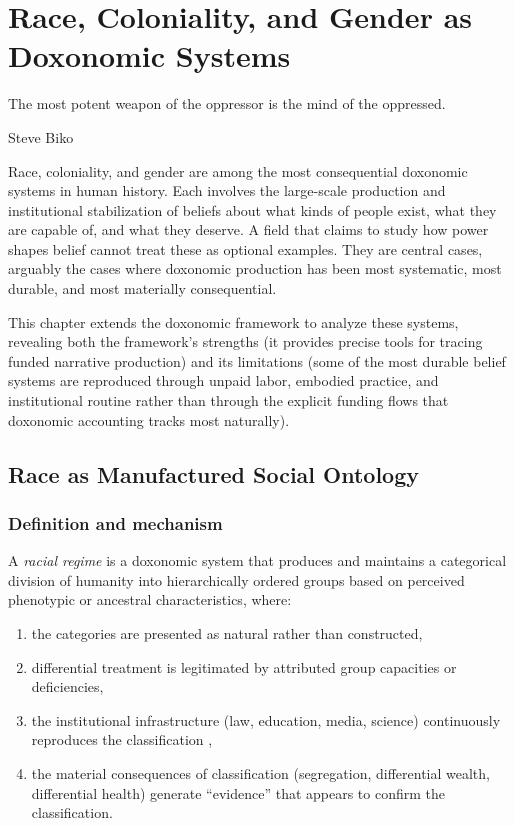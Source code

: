 \chapter{Race, Coloniality, and Gender as Doxonomic Systems}
\label{ch:race-coloniality-gender}

\epigraph{The most potent weapon of the oppressor is the mind of the oppressed.}{Steve Biko}

\noindent
Race, coloniality, and gender are among the most consequential doxonomic systems in human history.
Each involves the large-scale production and institutional stabilization of beliefs about what kinds of people exist, what they are capable of, and what they deserve.
A field that claims to study how power shapes belief cannot treat these as optional examples.
They are central cases, arguably the cases where doxonomic production has been most systematic, most durable, and most materially consequential.

This chapter extends the doxonomic framework to analyze these systems, revealing both the framework's strengths (it provides precise tools for tracing funded narrative production) and its limitations (some of the most durable belief systems are reproduced through unpaid labor, embodied practice, and institutional routine rather than through the explicit funding flows that doxonomic accounting tracks most naturally).

\section{Race as Manufactured Social Ontology}
\label{sec:ch24b-race}

\subsection{Definition and mechanism}

\begin{definition}
\label{def:racial-regime}
A \emph{racial regime} is a doxonomic system that produces and maintains a categorical division of humanity into hierarchically ordered groups based on perceived phenotypic or ancestral characteristics, where:
\begin{enumerate}[nosep]
  \item the categories are presented as natural rather than constructed,
  \item differential treatment is legitimated by attributed group capacities or deficiencies,
  \item the institutional infrastructure (law, education, media, science) continuously reproduces the classification \autocite{gould1981},
  \item the material consequences of classification (segregation, differential wealth, differential health) generate ``evidence'' that appears to confirm the classification.
\end{enumerate}
\end{definition}

